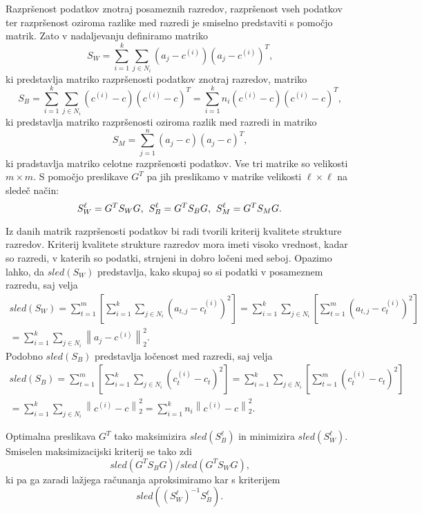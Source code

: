 \documentclass[mat1]{article}
\newcommand{\norm}[1]{\left\lVert#1\right\rVert}
\theoremstyle{definition}
\begin{document}
Razpršenost podatkov znotraj posameznih razredov, razpršenost vseh podatkov ter razpršenost oziroma razlike med razredi je smiselno predstaviti s pomočjo matrik. Zato v nadaljevanju definiramo matriko
$$S_W = \sum_{i = 1}^{k} \sum_{j \in N_i}(a_j - c^{(i)})(a_j - c^{(i)})^T\text{,}$$
ki predstavlja matriko razpršenosti podatkov znotraj razredov, matriko
$$S_B = \sum_{i = 1}^{k} \sum_{j \in N_i} ( c^{(i)} - c)( c^{(i)} - c)^T = \sum_{i = 1}^{k} n_i ( c^{(i)} - c)( c^{(i)} - c)^T \text{,}$$
ki predstavlja matriko razpršenosti oziroma razlik med razredi in matriko
$$S_M = \sum_{j = 1}^{n} (a_j - c)(a_j - c)^T \text{,}$$
ki pradstavlja matriko celotne razpršenosti podatkov. Vse tri matrike so velikosti $m \times m$.
S pomočjo preslikave $G^T$ pa jih preslikamo v matrike velikosti $\ell \times \ell$ na sledeč način:
$$ S_{W}^{\ell} = G^T S_W G \text{,} \hspace{2mm} S_{B}^{\ell} = G^T S_B G \text{,} \hspace{2mm} S_{M}^{\ell} = G^T S_M G \text{.}
$$

Iz danih matrik razpršenosti podatkov bi radi tvorili kriterij kvalitete strukture razredov. Kriterij kvalitete strukture razredov mora imeti visoko vrednost, kadar so razredi, v katerih so podatki, strnjeni in dobro ločeni med seboj. Opazimo lahko, da $sled(S_W)$ predstavlja, kako skupaj so si podatki v posameznem razredu, saj velja
\begin{gather*} 
sled(S_W) = \sum_{t=1}^{m} \left[ \sum_{i = 1}^{k} \sum_{j \in N_i}(a_{t, j} - c_t^{(i)})^2 \right]
= \sum_{i = 1}^{k} \sum_{j \in N_i} \left[ \sum_{t=1}^{m} (a_{t, j} - c_t^{(i)})^2 \right] \\
= \sum_{i = 1}^{k} \sum_{j \in N_i} \norm{ a_j - c^{(i)}}_2^2 \text{.}
\end{gather*}
Podobno $sled(S_B)$ predstavlja ločenost med razredi, saj velja
\begin{gather*} 
sled(S_B) = \sum_{t=1}^{m} \left[ \sum_{i = 1}^{k} \sum_{j \in N_i}(c_t^{(i)} - c_t)^2\right]
= \sum_{i = 1}^{k} \sum_{j \in N_i} \left[ \sum_{t=1}^{m} (c_t^{(i)} - c_t)^2 \right] \\
= \sum_{i = 1}^{k} \sum_{j \in N_i} \norm{ c^{(i)} - c}_2^2 
= \sum_{i = 1}^{k} n_i \norm{ c^{(i)} - c}_2^2
\text{.}
\end{gather*}

Optimalna preslikava $G^T$ tako maksimizira $sled(S_{B}^{\ell})$ in minimizira $sled(S_{W}^{\ell})$. Smiselen maksimizacijski kriterij se tako zdi $$sled( G^T S_B G) / sled( G^T S_W G) \text{,}$$ ki pa ga zaradi lažjega računanja aproksimiramo kar s kriterijem $$sled((S_W^\ell)^{-1}S_B^\ell) \text{.}$$
\end{document}
